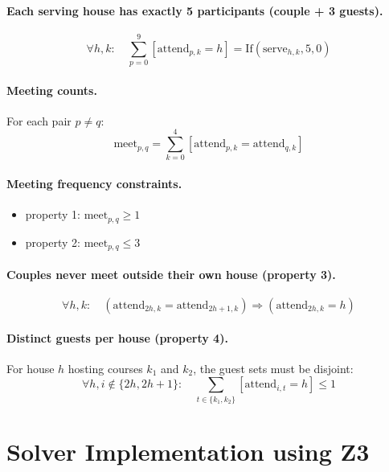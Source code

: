 \documentclass{article}
\begin{document}
\paragraph{Each serving house has exactly 5 participants (couple + 3 guests).}
\[
\forall h,k:\quad \sum_{p=0}^{9} [\text{attend}_{p,k} = h] = \text{If}(\text{serve}_{h,k}, 5, 0)
\]

\paragraph{Meeting counts.}  
For each pair $p \neq q$:
\[
\text{meet}_{p,q} = \sum_{k=0}^{4} [\text{attend}_{p,k} = \text{attend}_{q,k}]
\]

\paragraph{Meeting frequency constraints.}
\begin{itemize}
    \item property 1: $\text{meet}_{p,q} \ge 1$
    \item property 2: $\text{meet}_{p,q} \le 3$
\end{itemize}



\paragraph{Couples never meet outside their own house (property 3).}
\[
\forall h,k:\quad (\text{attend}_{2h,k} = \text{attend}_{2h+1,k}) \Rightarrow (\text{attend}_{2h,k} = h)
\]


\paragraph{Distinct guests per house (property 4).}  
For house $h$ hosting courses $k_1$ and $k_2$, the guest sets must be disjoint:
\[
\forall h, i \notin \{2h,2h+1\}:\quad \sum_{t\in\{k_1,k_2\}} [\text{attend}_{i,t} = h] \le 1
\]

\section{Solver Implementation using Z3}
\end{document}
